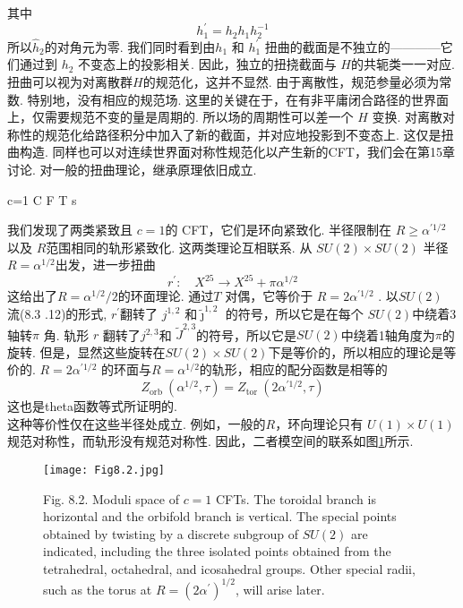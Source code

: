 其中
\begin{equation}
	h_{1}^{\prime}=h_{2} h_{1} h_{2}^{-1}
\end{equation}
所以$\hat{h}_{2}$的对角元为零. 我们同时看到由$h_{1}$ 和 $h_{1}^{\prime}$ 扭曲的截面是不独立的————它们通过到 $h_{2}$ 不变态上的投影相关. 因此，独立的扭挠截面与 $H$的共轭类一一对应.\\
扭曲可以视为对离散群$H$的规范化，这并不显然. 由于离散性，规范参量必须为常数. 特别地，没有相应的规范场. 这里的关键在于，在有非平庸闭合路径的世界面上，仅需要规范不变的量是周期的. 所以场的周期性可以差一个 $H$ 变换. 对离散对称性的规范化给路径积分中加入了新的截面，并对应地投影到不变态上. 这仅是扭曲构造. 同样也可以对连续世界面对称性规范化以产生新的CFT，我们会在第15章讨论.
对一般的扭曲理论，继承原理依旧成立.\\

\centerline{\Large c=1 C F T s}	

我们发现了两类紧致且 $c=1$的 CFT，它们是环向紧致化. 半径限制在 $R \geq \alpha^{\prime 1 / 2}$ 以及 $R$范围相同的轨形紧致化. 这两类理论互相联系. 从 $S U(2) \times S U(2)$ 半径 $R=\alpha^{1 / 2}$出发，进一步扭曲
\begin{equation}
	r^{\prime}: \quad X^{25} \rightarrow X^{25}+\pi \alpha^{1 / 2}
\end{equation}
这给出了$R=\alpha^{1 / 2} / 2$的环面理论. 通过$T$ 对偶，它等价于 $R=2 \alpha^{\prime 1 / 2} $ . 以$S U(2)$ 流(8.3 .12)的形式,  $r^{\prime}$翻转了 $j^{1,2}$ 和$\tilde{\jmath}^{1,2}$ 的符号，所以它是在每个 $S U(2) $中绕着3轴转$\pi$ 角. 轨形 $r$ 翻转了$j^{2,3}$和 $\tilde{J}^{2,3}$的符号，所以它是$S U(2) $中绕着1轴角度为$\pi$的旋转. 但是，显然这些旋转在$S U(2) \times S U(2)$下是等价的，所以相应的理论是等价的. $R=2 \alpha^{\prime 1 / 2}$ 的环面与$R=\alpha^{1 / 2}$的轨形，相应的配分函数是相等的
\begin{equation}
	Z_{\text {orb }}\left(\alpha^{1 / 2}, \tau\right)=Z_{\text {tor }}\left(2 \alpha^{\prime 1 / 2}, \tau\right)
\end{equation}
这也是theta函数等式所证明的.\\
这种等价性仅在这些半径处成立. 例如，一般的$R$，环向理论只有 $U(1) \times U(1)$规范对称性，而轨形没有规范对称性. 因此，二者模空间的联系如图\ref{Fig8.2}所示. 

\begin{figure}
	\begin{center}
		\texttt{[image: Fig8.2.jpg]}\\
		\caption{Fig. 8.2. Moduli space of $c=1$ CFTs. The toroidal branch is horizontal and the orbifold branch is vertical. The special points obtained by twisting by a discrete subgroup of $S U(2)$ are indicated, including the three isolated points obtained from the tetrahedral, octahedral, and icosahedral groups. Other special radii, such as the torus at $R=\left(2 \alpha^{\prime}\right)^{1 / 2}$, will arise later.}\label{Fig8.2}
	\end{center}
\end{figure}

